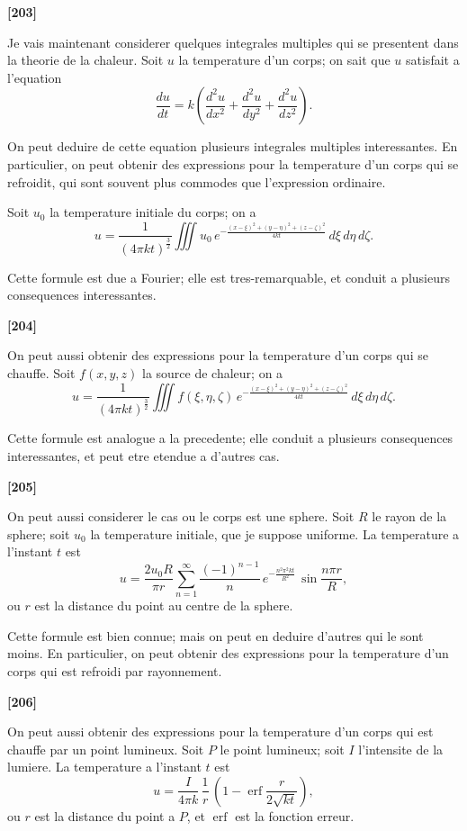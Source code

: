 \documentclass[11pt,a4paper]{article}
\DeclareMathOperator{\erf}{erf}
\begin{document}
\textbf{[203]}

Je vais maintenant considerer quelques integrales multiples qui se presentent dans
la theorie de la chaleur. Soit $u$ la temperature d'un corps; on sait que $u$ satisfait a
l'equation
\[\frac{du}{dt} = k\left(\frac{d^2u}{dx^2} + \frac{d^2u}{dy^2} + \frac{d^2u}{dz^2}\right).\]

On peut deduire de cette equation plusieurs integrales multiples interessantes. En
particulier, on peut obtenir des expressions pour la temperature d'un corps qui se
refroidit, qui sont souvent plus commodes que l'expression ordinaire.

Soit $u_0$ la temperature initiale du corps; on a
\[u = \frac{1}{(4\pi k t)^{\frac{3}{2}}} \iiint u_0\, e^{-\frac{(x - \xi)^2 + (y - \eta)^2 + (z - \zeta)^2}{4kt}}\, d\xi\, d\eta\, d\zeta.\]

Cette formule est due a Fourier; elle est tres-remarquable, et conduit a plusieurs
consequences interessantes.

\textbf{[204]}

On peut aussi obtenir des expressions pour la temperature d'un corps qui se
chauffe. Soit $f(x, y, z)$ la source de chaleur; on a
\[u = \frac{1}{(4\pi k t)^{\frac{3}{2}}} \iiint f(\xi, \eta, \zeta)\, e^{-\frac{(x - \xi)^2 + (y - \eta)^2 + (z - \zeta)^2}{4kt}}\, d\xi\, d\eta\, d\zeta.\]

Cette formule est analogue a la precedente; elle conduit a plusieurs consequences
interessantes, et peut etre etendue a d'autres cas.

\textbf{[205]}

On peut aussi considerer le cas ou le corps est une sphere. Soit $R$ le rayon de la
sphere; soit $u_0$ la temperature initiale, que je suppose uniforme. La temperature a l'instant
$t$ est
\[u = \frac{2u_0 R}{\pi r} \sum_{n=1}^{\infty} \frac{(-1)^{n-1}}{n}\, e^{-\frac{n^2 \pi^2 k t}{R^2}}\, \sin\frac{n\pi r}{R},\]
ou $r$ est la distance du point au centre de la sphere.

Cette formule est bien connue; mais on peut en deduire d'autres qui le sont moins.
En particulier, on peut obtenir des expressions pour la temperature d'un corps qui est
refroidi par rayonnement.

\textbf{[206]}

On peut aussi obtenir des expressions pour la temperature d'un corps qui est
chauffe par un point lumineux. Soit $P$ le point lumineux; soit $I$ l'intensite de la
lumiere. La temperature a l'instant $t$ est
\[u = \frac{I}{4\pi k}\, \frac{1}{r}\, \left(1 - \erf\frac{r}{2\sqrt{kt}}\right),\]
ou $r$ est la distance du point a $P$, et $\erf$ est la fonction erreur.
\end{document}
